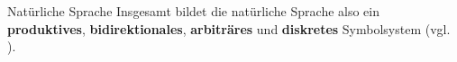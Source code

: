 
\begin{frame}
		
	\begin{block}{Natürliche Sprache}
			Insgesamt bildet die natürliche Sprache also ein \textbf{produktives}, \textbf{bidirektionales}, \textbf{arbiträres} und \textbf{diskretes} Symbolsystem (vgl. \citet{Luedeling09a}).
	\end{block}

\end{frame}	


